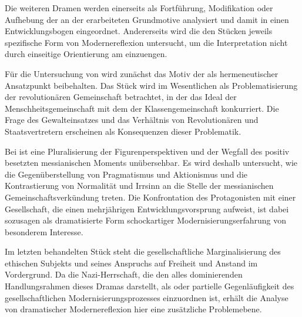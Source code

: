 
Die weiteren Dramen werden einerseits als Fortführung, Modifikation
oder Aufhebung der an der  erarbeiteten Grundmotive
analysiert und damit in einen Entwicklungsbogen eingeordnet.
Andererseits wird die den Stücken jeweils spezifische Form von
Modernereflexion untersucht, um die Interpretation nicht durch
einseitige Orientierung am \Cite{messianischen Expressionismus}
einzuengen.

Für die Untersuchung von  wird zunächst das
Motiv der  als hermeneutischer Ansatzpunkt
beibehalten. Das Stück wird im Wesentlichen als Problematisierung
der revolutionären Gemeinschaft betrachtet, in der das Ideal der
Menschheitsgemeinschaft mit dem der Klassengemeinschaft konkurriert.
Die Frage des Gewalteinsatzes und das Verhältnis von Revolutionären und
Staatsvertretern erscheinen als Konsequenzen dieser Problematik.

Bei  ist eine Pluralisierung der
Figurenperspektiven und der Wegfall des positiv besetzten
messianischen Moments unübersehbar. Es wird deshalb untersucht, wie die
Gegenüberstellung von Pragmatismus und Aktionismus und die Kontrastierung von
Normalität und Irrsinn an die Stelle der messianischen Gemeinschaftsverkündung
treten. Die Konfrontation des Protagonisten mit einer Gesellschaft, die
einen mehrjährigen Entwicklungsvorsprung aufweist, ist dabei sozusagen
als dramatisierte Form schockartiger Modernisierungserfahrung von
besonderem Interesse.

Im letzten behandelten Stück  steht die gesellschaftliche
Marginalisierung des ethischen Subjekts und seines Anspruchs auf
Freiheit und Anstand im Vordergrund. Da die Nazi-Herrschaft, die den
alles dominierenden Handlungsrahmen dieses Dramas darstellt, als
\Cite{Verwerfung} oder partielle Gegenläufigkeit des gesellschaftlichen
Modernisierungsprozesses einzuordnen ist, erhält die Analyse von
dramatischer Modernereflexion hier eine zusätzliche Problemebene.  

